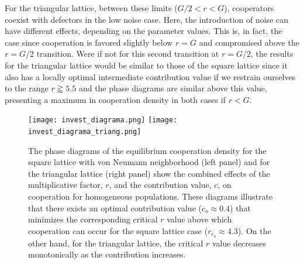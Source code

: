 \documentclass[twocolumn,aps,amsmath,pre,floatfix,superscriptaddress]{revtex4-2}
\begin{document}
For the triangular lattice, between these limits ($G/2<r<G$), cooperators coexist with defectors in the low noise case.  
Here, the introduction of noise can have different effects, depending on the parameter values. This is, in fact, the case since cooperation is favored slightly below $r=G$  and compromised above  the $r=G/2$ transition. 
%
Were if not for this second transition at $r=G/2$, the results for the triangular lattice would be similar to those of the square lattice since it also has a locally optimal intermediate contribution value if we restrain ourselves to the range $r\gtrapprox 5.5$ and the phase diagrams are similar above this value, presenting a maximum in cooperation density in both cases if $r<G$.
% 




\begin{figure}[t]
    \centering
    \texttt{[image: invest\_diagrama.png]}
    \texttt{[image: invest\_diagrama\_triang.png]}
    \caption{
     The phase diagrams of the equilibrium cooperation density for the square lattice with von Neumann neighborhood (left panel)  and for the triangular lattice (right panel) show the combined  effects of the multiplicative factor, $r$, and the contribution value, $c$, on cooperation for homogeneous populations. These diagrams illustrate that there exists an optimal contribution value ($c_o \approx 0.4$)  that minimizes the corresponding critical $r$ value above which cooperation can occur for the square lattice case ($r_{c_o} \approx 4.3$). On the other hand, for the triangular lattice, the critical $r$ value decreases monotonically as the contribution increases.
    }
    \label{diagrama}
    
\end{figure}
\end{document}
